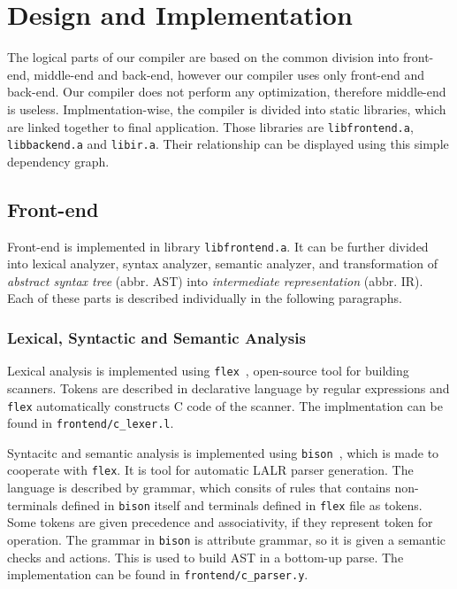 \documentclass[12pt]{article}
\begin{document}
\section{Design and Implementation}
The logical parts of our compiler are based on the common division into front-end, middle-end and back-end, however our compiler uses only front-end and back-end.
Our compiler does not perform any optimization, therefore middle-end is useless.
Implmentation-wise, the compiler is divided into static libraries, which are linked together to final application.
Those libraries are \texttt{libfrontend.a}, \texttt{libbackend.a} and \texttt{libir.a}. Their relationship can be displayed using this simple dependency graph.
\begin{figure}[!h]
	\centering
\end{figure}
\subsection{Front-end}
Front-end is implemented in library \texttt{libfrontend.a}. It can be further divided into lexical analyzer, syntax analyzer, semantic analyzer,
and transformation of \emph{abstract syntax tree} (abbr. AST) into
\emph{intermediate representation} (abbr. IR). Each of these parts is described individually in the following paragraphs.

\subsubsection{Lexical, Syntactic and Semantic Analysis}
Lexical analysis is implemented using \texttt{flex}~\cite{flex}, open-source tool for building scanners. Tokens are described in declarative language
by regular expressions and \texttt{flex} automatically constructs C code of the scanner.
The implmentation can be found in \texttt{frontend/c\_lexer.l}.

Syntacitc and semantic analysis is implemented using \texttt{bison}~\cite{bison}, which is made to cooperate with \texttt{flex}. It is tool
for automatic LALR parser generation. The language is described by grammar, which consits of rules that contains non-terminals defined in \texttt{bison} itself
and terminals defined in \texttt{flex} file as tokens. Some tokens are given precedence and associativity, if they represent token for operation.
The grammar in \texttt{bison} is attribute grammar, so it is given a semantic checks and actions. This is used to build AST in a bottom-up parse.
The implementation can be found in \texttt{frontend/c\_parser.y}.
\end{document}
